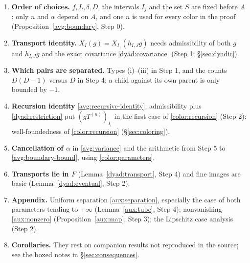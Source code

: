 \documentclass[11pt]{article}
\theoremstyle{definition}
\numberwithin{equation}{section}
\begin{document}
\begin{enumerate}
\item \textbf{Order of choices.} $f,L,\delta,D$, the intervals $I_j$ and
the set $S$ are fixed before $A$; only $n$ and $\alpha$ depend on $A$,
and one $n$ is used for every color in the proof
(Proposition~\ref{avg:boundary}, Step 0).
\item \textbf{Transport identity.} $X_I(g)=X_{I_1}(h_{I,J}g)$ needs
admissibility of both $g$ and $h_{I,J}g$ and the exact covariance
\eqref{dyad:covariance} (Step 1; \S\ref{sec:dyadic}).
\item \textbf{Which pairs are separated.} Types (i)--(iii) in Step 1,
and the counts $D(D-1)$ versus $D$ in Step 4; a child against its own
parent is only bounded by $-1$.
\item \textbf{Recursion identity} \eqref{avg:recursive-identity}:
admissibility plus \eqref{dyad:restriction} put
$(gT^{(n)})_{I_i}$ in the first case of \eqref{color:recursion}
(Step 2); well-foundedness of \eqref{color:recursion}
(\S\ref{sec:coloring}).
\item \textbf{Cancellation of $\alpha$} in \eqref{avg:variance} and the
arithmetic from Step 5 to \eqref{avg:boundary-bound}, using
\eqref{color:parameters}.
\item \textbf{Transports lie in $F$} (Lemma~\ref{dyad:transport},
Step 4) and fine images are basic (Lemma~\ref{dyad:eventual}, Step 2).
\item \textbf{Appendix.} Uniform separation \eqref{aux:separation},
especially the case of both parameters tending to $+\infty$
(Lemma~\ref{aux:tube}, Step 4); nonvanishing \eqref{aux:nonzero}
(Proposition~\ref{aux:map}, Step 3); the Lipschitz case analysis
(Step 2).
\item \textbf{Corollaries.} They rest on companion results not
reproduced in the source; see the boxed notes in
\S\ref{sec:consequences}.
\end{enumerate}



\end{document}
